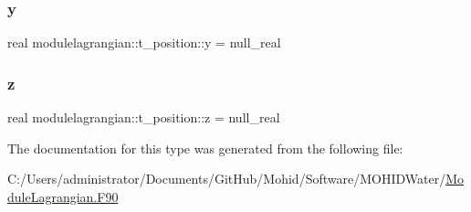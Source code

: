 \mbox{\label{structmodulelagrangian_1_1t__position_a25e250ef0fefdc552cce5d3dfb392a65}} 
\subsubsection{\texorpdfstring{y}{y}}
{\footnotesize\ttfamily real modulelagrangian\+::t\+\_\+position\+::y = null\+\_\+real\hspace{0.3cm}{\ttfamily [private]}}

\mbox{\label{structmodulelagrangian_1_1t__position_a89877ec4dbe96ee94fc21e6018314c6d}} 
\subsubsection{\texorpdfstring{z}{z}}
{\footnotesize\ttfamily real modulelagrangian\+::t\+\_\+position\+::z = null\+\_\+real\hspace{0.3cm}{\ttfamily [private]}}



The documentation for this type was generated from the following file\+:\begin{DoxyCompactItemize}
\item 
C\+:/\+Users/administrator/\+Documents/\+Git\+Hub/\+Mohid/\+Software/\+M\+O\+H\+I\+D\+Water/\mbox{\hyperlink{_module_lagrangian_8_f90}{Module\+Lagrangian.\+F90}}\end{DoxyCompactItemize}
